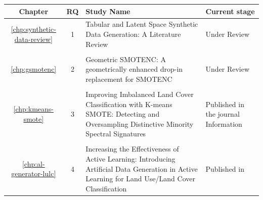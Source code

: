 \begin{table}%
    \centering
    \begin{tabular}{ccm{}m{}}
        \toprule
        Chapter & RQ & Study Name                                                        & Current stage  \\
        \midrule
        \ref{chp:synthetic-data-review} & 1    & Tabular and Latent Space
                                                 Synthetic Data Generation: 
                                                 A Literature Review                      & Under Review   \\
        \vspace{-.2cm}\\
        \ref{chp:gsmotenc} & 2     & Geometric SMOTENC\@: A geometrically
                                     enhanced drop-in replacement for SMOTENC          & Under Review    \\
        \vspace{-.2cm}\\
        \ref{chp:kmeans-smote}             & 3    & Improving Imbalanced Land Cover 
                                                   Classification with K-means SMOTE: 
                                                   Detecting and Oversampling 
                                                   Distinctive Minority Spectral 
                                                   Signatures                          & Published in 
                                                                                         the journal 
                                                                                         Information      \\
        \vspace{-.2cm}\\
        \ref{chp:al-generator-lulc}        & 4    & Increasing the Effectiveness of 
                                                   Active Learning: Introducing
                                                   Artificial Data Generation in 
                                                   Active Learning for Land Use/Land 
                                                   Cover Classification                & Published in 

\end{tabular}
\end{table}

